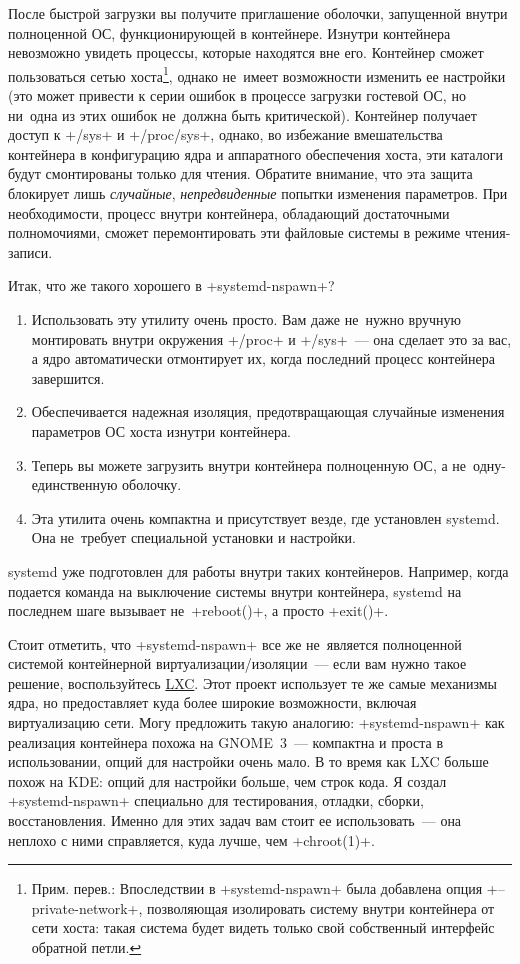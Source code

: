 \documentclass[10pt,oneside,a4paper]{article}
\begin{document}
После быстрой загрузки вы получите приглашение оболочки, запущенной внутри
полноценной ОС, функционирующей в контейнере. Изнутри контейнера невозможно
увидеть процессы, которые находятся вне его. Контейнер сможет пользоваться сетью
хоста\footnote{Прим. перев.: Впоследствии в +systemd-nspawn+ была добавлена
опция +--private-network+, позволяющая изолировать систему внутри контейнера от
сети хоста: такая система будет видеть только свой собственный интерфейс
обратной петли.}, однако не~имеет возможности изменить ее настройки (это может
привести к серии ошибок в процессе загрузки гостевой ОС, но ни~одна из этих
ошибок не~должна быть критической). Контейнер получает доступ к +/sys+ и
+/proc/sys+, однако, во избежание вмешательства контейнера в конфигурацию ядра и
аппаратного обеспечения хоста, эти каталоги будут смонтированы только для
чтения. Обратите внимание, что эта защита блокирует лишь \emph{случайные},
\emph{непредвиденные} попытки изменения параметров. При необходимости, процесс
внутри контейнера, обладающий достаточными полномочиями, сможет перемонтировать
эти файловые системы в режиме чтения-записи.

Итак, что же такого хорошего в +systemd-nspawn+?
\begin{enumerate}
	\item Использовать эту утилиту очень просто. Вам даже не~нужно вручную
		монтировать внутри окружения +/proc+ и +/sys+~--- она сделает
		это за вас, а ядро автоматически отмонтирует их, когда последний
		процесс контейнера завершится.
	\item Обеспечивается надежная изоляция, предотвращающая случайные
		изменения параметров ОС хоста изнутри контейнера.
	\item Теперь вы можете загрузить внутри контейнера полноценную ОС, а
		не~одну-единственную оболочку.
	\item Эта утилита очень компактна и присутствует везде, где установлен
		systemd. Она не~требует специальной установки и настройки.
\end{enumerate}

systemd уже подготовлен для работы внутри таких контейнеров. Например, когда
подается команда на выключение системы внутри контейнера, systemd на последнем
шаге вызывает не~+reboot()+, а просто +exit()+.

Стоит отметить, что +systemd-nspawn+ все же не~является полноценной системой
контейнерной виртуализации/изоляции~--- если вам нужно такое решение,
воспользуйтесь \href{ http://lxc.sourceforge.net/}{LXC}. Этот проект использует
те же самые механизмы ядра, но предоставляет куда более широкие возможности,
включая виртуализацию сети. Могу предложить такую аналогию: +systemd-nspawn+ как
реализация контейнера похожа на GNOME~3~--- компактна и проста в использовании,
опций для настройки очень мало. В то время как LXC больше похож на KDE: опций
для настройки больше, чем строк кода. Я создал +systemd-nspawn+ специально для
тестирования, отладки, сборки, восстановления. Именно для этих задач вам стоит
ее использовать~--- она неплохо с ними справляется, куда лучше, чем +chroot(1)+.
\end{document}
